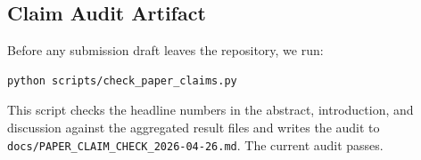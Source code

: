 

\subsection{Claim Audit Artifact}

Before any submission draft leaves the repository, we run:
\begin{verbatim}
python scripts/check_paper_claims.py
\end{verbatim}
This script checks the headline numbers in the abstract, introduction, and discussion against the aggregated result files and writes the audit to \texttt{docs/PAPER\_CLAIM\_CHECK\_2026-04-26.md}. The current audit passes.
